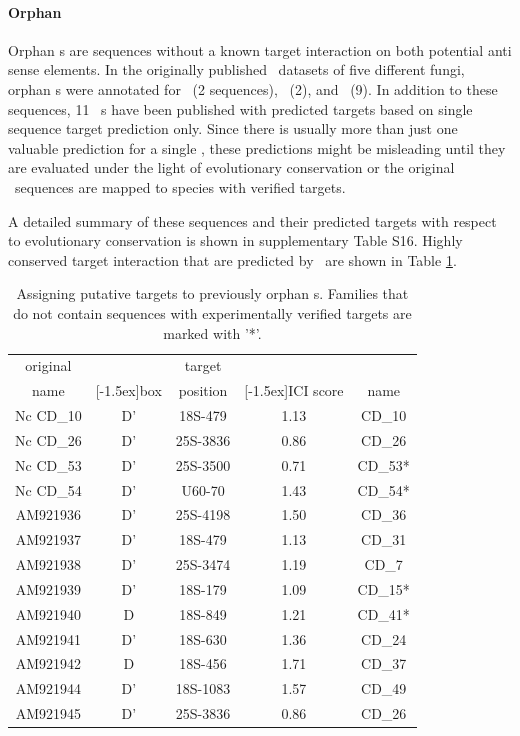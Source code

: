 \paragraph{\textbf{Orphan \sno}}
Orphan \sno s are sequences without a known target interaction on both
potential anti sense elements. In the originally published \sno\
datasets of five different fungi, orphan \cd s were annotated for
\sce\ (2 sequences), \ncr\ (2), and \afu\ (9). In addition to these
sequences, 11 \ncr\ \sno s have been published with predicted targets
based on single sequence target prediction only. Since there is
usually more than just one valuable prediction for a single \sno,
these predictions might be misleading until they are evaluated under
the light of evolutionary conservation or the original \sno\ sequences
are mapped to species with verified targets.

A detailed summary of these sequences and their predicted targets with
respect to evolutionary conservation is shown in supplementary Table
S16. Highly conserved target interaction that are predicted by
\snostrip\ are shown in Table \ref{tab:orphan_cd_snoRNAs_short}.

\begin{table}
  \caption{Assigning putative targets to previously
    orphan \cd s. Families that do not contain sequences with
    experimentally verified targets are marked with '*'. }
  \label{tab:orphan_cd_snoRNAs_short}
  \begin{center}
    \begin{footnotesize}
      \begin{tabular}{c|c|c|c|c}
      original&&target&&\snostrip\\
      name&\raisebox{1.5ex}[-1.5ex]{box}&position&\raisebox{1.5ex}[-1.5ex]{ICI
      score}&name\\
  \hline
  Nc CD\_10&D'&18S-479&1.13&CD\_10\\
\hline
  Nc CD\_26&D'&25S-3836&0.86&CD\_26\\
\hline
  Nc CD\_53&D'&25S-3500&0.71&CD\_53*\\
\hline
  Nc CD\_54&D'&U60-70&1.43&CD\_54*\\
 \hline
  AM921936&D'&25S-4198&1.50&CD\_36\\
\hline
  AM921937&D'&18S-479&1.13&CD\_31\\
\hline
  AM921938&D'&25S-3474&1.19&CD\_7\\
\hline
  AM921939&D'&18S-179&1.09&CD\_15*\\
\hline
  AM921940&D&18S-849&1.21&CD\_41*\\
\hline
  AM921941&D'&18S-630&1.36&CD\_24\\
\hline
  AM921942&D&18S-456&1.71&CD\_37\\
\hline
  AM921944&D'&18S-1083&1.57&CD\_49\\
\hline
  AM921945&D'&25S-3836&0.86&CD\_26\\

    \end{tabular}
    \end{footnotesize}
  \end{center} 
\end{table}


